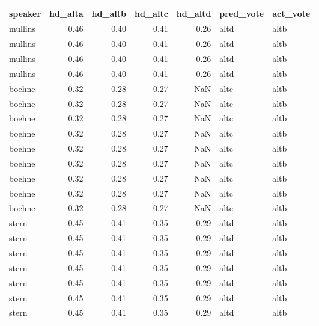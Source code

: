 \begin{tabular}{lrrrrll}
\toprule
   speaker &  hd\_alta &  hd\_altb &  hd\_altc &  hd\_altd & pred\_vote & act\_vote \\
\midrule
   mullins &     0.46 &     0.40 &     0.41 &     0.26 &      altd &     altb \\
   mullins &     0.46 &     0.40 &     0.41 &     0.26 &      altd &     altb \\
   mullins &     0.46 &     0.40 &     0.41 &     0.26 &      altd &     altb \\
   mullins &     0.46 &     0.40 &     0.41 &     0.26 &      altd &     altb \\
    boehne &     0.32 &     0.28 &     0.27 &      NaN &      altc &     altb \\
    boehne &     0.32 &     0.28 &     0.27 &      NaN &      altc &     altb \\
    boehne &     0.32 &     0.28 &     0.27 &      NaN &      altc &     altb \\
    boehne &     0.32 &     0.28 &     0.27 &      NaN &      altc &     altb \\
    boehne &     0.32 &     0.28 &     0.27 &      NaN &      altc &     altb \\
    boehne &     0.32 &     0.28 &     0.27 &      NaN &      altc &     altb \\
    boehne &     0.32 &     0.28 &     0.27 &      NaN &      altc &     altb \\
    boehne &     0.32 &     0.28 &     0.27 &      NaN &      altc &     altb \\
    boehne &     0.32 &     0.28 &     0.27 &      NaN &      altc &     altb \\
     stern &     0.45 &     0.41 &     0.35 &     0.29 &      altd &     altb \\
     stern &     0.45 &     0.41 &     0.35 &     0.29 &      altd &     altb \\
     stern &     0.45 &     0.41 &     0.35 &     0.29 &      altd &     altb \\
     stern &     0.45 &     0.41 &     0.35 &     0.29 &      altd &     altb \\
     stern &     0.45 &     0.41 &     0.35 &     0.29 &      altd &     altb \\
     stern &     0.45 &     0.41 &     0.35 &     0.29 &      altd &     altb \\
     stern &     0.45 &     0.41 &     0.35 &     0.29 &      altd &     altb \\

\end{tabular}
